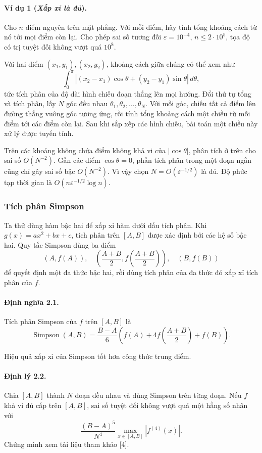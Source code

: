 \documentclass[11pt]{article}
\begin{document}
\paragraph{Ví dụ 1 (\emph{Xấp xỉ là đủ}).}
Cho $n$ điểm nguyên trên mặt phẳng. Với mỗi điểm, hãy tính tổng khoảng cách từ
nó tới mọi điểm còn lại. Cho phép sai số tương đối
$\varepsilon=10^{-4}$, $n\le2\cdot10^5$, tọa độ có trị tuyệt đối không vượt quá
$10^8$.

Với hai điểm $(x_1,y_1),(x_2,y_2)$, khoảng cách giữa chúng có thể xem như
\[
  \int_0^\pi |(x_2-x_1)\cos\theta+(y_2-y_1)\sin\theta|\,d\theta,
\]
tức tích phân của độ dài hình chiếu đoạn thẳng lên mọi hướng. Đổi thứ tự tổng
và tích phân, lấy $N$ góc đều nhau $\theta_1,\theta_2,\ldots,\theta_N$. Với
mỗi góc, chiếu tất cả điểm lên đường thẳng vuông góc tương ứng, rồi tính tổng
khoảng cách một chiều từ mỗi điểm tới các điểm còn lại. Sau khi sắp xếp các
hình chiếu, bài toán một chiều này xử lý được tuyến tính.

Trên các khoảng không chứa điểm không khả vi của $|\cos\theta|$, phân tích ở
trên cho sai số $O(N^{-2})$. Gần các điểm $\cos\theta=0$, phần tích phân trong
một đoạn ngắn cũng chỉ gây sai số bậc $O(N^{-2})$. Vì vậy chọn
$N=O(\varepsilon^{-1/2})$ là đủ. Độ phức tạp thời gian là
$O(n\varepsilon^{-1/2}\log n)$.

\subsubsection{Tích phân Simpson}

Ta thử dùng hàm bậc hai để xấp xỉ hàm dưới dấu tích phân. Khi
$g(x)=ax^2+bx+c$, tích phân trên $[A,B]$ được xác định bởi các hệ số bậc hai.
Quy tắc Simpson dùng ba điểm
\[
  (A,f(A)),\quad \left(\frac{A+B}{2},f\!\left(\frac{A+B}{2}\right)\right),
  \quad (B,f(B))
\]
để quyết định một đa thức bậc hai, rồi dùng tích phân của đa thức đó xấp xỉ
tích phân của $f$.

\paragraph{Định nghĩa 2.1.}
Tích phân Simpson của $f$ trên $[A,B]$ là
\[
  \operatorname{Simpson}(A,B)
  =\frac{B-A}{6}\left(
    f(A)+4f\!\left(\frac{A+B}{2}\right)+f(B)
  \right).
\]

Hiệu quả xấp xỉ của Simpson tốt hơn công thức trung điểm.

\paragraph{Định lý 2.2.}
Chia $[A,B]$ thành $N$ đoạn đều nhau và dùng Simpson trên từng đoạn. Nếu $f$
khả vi đủ cấp trên $[A,B]$, sai số tuyệt đối không vượt quá một hằng số nhân
với
\[
  \frac{(B-A)^5}{N^4}\max_{x\in[A,B]}|f^{(4)}(x)|.
\]
Chứng minh xem tài liệu tham khảo [4].
\end{document}
